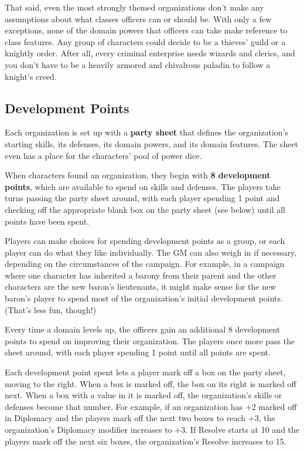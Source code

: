\documentclass[10pt,a4paper,twoside,bg=print,twocolumn,openany,nodeprecatedcode]{dndbook}
\begin{document}
That said, even the most strongly themed organizations don't make any assumptions about what classes officers can or should be. With only a few exceptions, none of the domain powers that officers can take make reference to class features. Any group of characters could decide to be a thieves' guild or a knightly order. After all, every criminal enterprise needs wizards and clerics, and you don't have to be a heavily armored and chivalrous paladin to follow a knight's creed.

\subsection{Development Points}
Each organization is set up with a \textbf{party sheet} that defines the organization's starting skills, its defenses, its domain powers, and its domain features. The sheet even has a place for the characters' pool of power dice.

When characters found an organization, they begin with \textbf{8 development points}, which are available to spend on skills and defenses. The players take turns passing the party sheet around, with each player spending 1 point and checking off the appropriate blank box on the party sheet (see below) until all points have been spent.

Players can make choices for spending development points as a group, or each player can do what they like individually. The GM can also weigh in if necessary, depending on the circumstances of the campaign. For example, in a campaign where one character has inherited a barony from their parent and the other characters are the new baron's lieutenants, it might make sense for the new baron's player to spend most of the organization's initial development points. (That's less fun, though!)

Every time a domain levels up, the officers gain an additional 8 development points to spend on improving their organization. The players once more pass the sheet around, with each player spending 1 point until all points are spent.

Each development point spent lets a player mark off a box on the party sheet, moving to the right. When a box is marked off, the box on its right is marked off next. When a box with a value in it is marked off, the organization's skills or defenses become that number. For example, if an organization has +2 marked off in Diplomacy and the players mark off the next two boxes to reach +3, the organization's Diplomacy modifier increases to +3. If Resolve starts at 10 and the players mark off the next six boxes, the organization's Resolve increases to 15.
\end{document}
